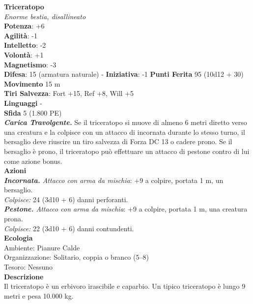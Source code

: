 \begin{multicols}{2}
\medskip\textbf{Triceratopo}\\
\emph{Enorme bestia, disallineato}\\
\textbf{Potenza}: +6\\
\textbf{Agilità}: -1\\
\textbf{Intelletto}: -2\\
\textbf{Volontà}: +1\\
\textbf{Magnetismo}: -3\\
\textbf{Difesa}: 15 (armatura naturale) - \textbf{Iniziativa}: -1
\textbf{Punti Ferita} 95 (10d12 + 30)\\
\textbf{Movimento} 15 m\\
\textbf{Tiri Salvezza}: Fort +15, Ref +8, Will +5\\
\textbf{Linguaggi} -\\
\textbf{Sfida} 5 (1.800 PE)\smallskip\\
\emph{\textbf{Carica Travolgente.}} Se il triceratopo si muove di almeno 6 metri diretto verso una creatura e la colpisce con un attacco di incornata durante lo stesso turno, il bersaglio deve riuscire un tiro salvezza di Forza DC 13 o cadere prono. Se il bersaglio è prono, il triceratopo può effettuare un attacco di pestone contro di lui come azione bonus.\\
\smallskip\textbf{Azioni}\\
\emph{\textbf{Incornata.} Attacco con arma da mischia}: +9 a colpire, portata 1 m, un bersaglio.\\
\emph{Colpisce:} 24 (3d10 + 6) danni perforanti.\\
\emph{\textbf{Pestone.} Attacco con arma da mischia}: +9 a colpire, portata 1 m, una creatura prona.\\
\emph{Colpisce:} 22 (3d10 + 6) danni contundenti.\\
\textbf{Ecologia}\\
Ambiente: Pianure Calde\\
Organizzazione: Solitario, coppia o branco (5–8)\\
Tesoro: Nessuno\\
\textbf{Descrizione}\\
Il triceratopo è un erbivoro irascibile e caparbio. Un tipico triceratopo è lungo 9 metri e pesa 10.000 kg.\\


\end{multicols}
